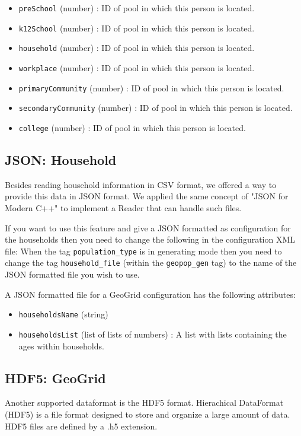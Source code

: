 \begin{itemize}
\begin{itemize}
			\item \texttt{preSchool} (number) : ID of pool in which this person is located.
			\item \texttt{k12School} (number) : ID of pool in which this person is located.
			\item \texttt{household} (number) : ID of pool in which this person is located.
			\item \texttt{workplace} (number) : ID of pool in which this person is located.
			\item \texttt{primaryCommunity} (number) : ID of pool in which this person is located.
			\item \texttt{secondaryCommunity} (number) : ID of pool in which this person is located.
			\item \texttt{college} (number) : ID of pool in which this person is located.
		\end{itemize}
\end{itemize}

\subsection{JSON: Household}
Besides reading household information in CSV format, we offered a way to provide this data in JSON format. We applied the same concept of "JSON for Modern C++" to implement a Reader that can handle such files.

If you want to use this feature and give a JSON formatted as configuration for the households then you need to change the following in the configuration XML file:
When the tag \texttt{population\_type} is in generating mode then you need to change the tag \texttt{household\_file} (within the \texttt{geopop\_gen} tag) to the name of the JSON formatted file you wish to use.

A JSON formatted file for a GeoGrid configuration has the following attributes:
\begin{itemize}
	\item \texttt{householdsName} (string)
	\item \texttt{householdsList} (list of lists of numbers) : A list with lists containing the ages within households.
\end{itemize}

\subsection{HDF5: GeoGrid}
Another supported dataformat is the HDF5 format. Hierachical DataFormat (HDF5) is a file format designed to store and organize a large amount of data. HDF5 files are defined by a .h5 extension.

